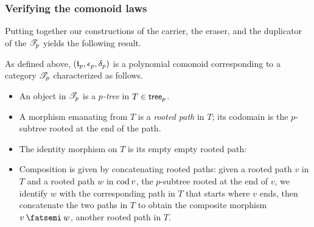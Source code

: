 \documentclass[Book-Poly]{subfiles}
\begin{document}
\subsubsection{Verifying the comonoid laws}

Putting together our constructions of the carrier, the eraser, and the duplicator of the $\mathscr{T}_{p}$ yields the following result.
\begin{proposition} \label{prop.cofree_as_cat}
As defined above, $\left(\mathfrak{t}_p,\epsilon_p,\delta_p\right)$ is a polynomial comonoid corresponding to a category $\mathscr{T}_{p}$ characterized as follows.
\begin{itemize}
    \item An object in $\mathscr{T}_{p}$ is a \textit{$p$-tree} in $T\in\mathsf{tree}_p$.
    \item A morphism emanating from $T$ is a \textit{rooted path} in $T$; its codomain is the $p$-subtree rooted at the end of the path.
    \item The identity morphism on $T$ is its empty empty rooted path:
    \item Composition is given by concatenating rooted paths: given a rooted path $v$ in $T$ and a rooted path $w$ in $\operatorname{cod} v$, the $p$-subtree rooted at the end of $v$, we identify $w$ with the corresponding path in $T$ that starts where $v$ ends, then concatenate the two paths in $T$ to obtain the composite morphism $v\then w$, another rooted path in $T$.
\end{itemize}
\end{proposition}
\end{document}
